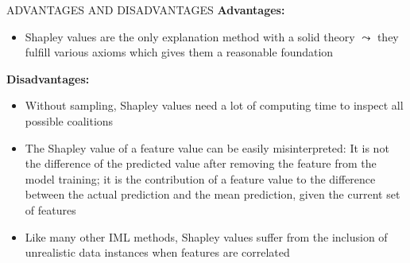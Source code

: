 \documentclass[11pt,compress,t,notes=noshow, aspectratio=169, xcolor=table]{beamer}
\begin{document}

\begin{vbframe}{ADVANTAGES AND DISADVANTAGES}
	\textbf{Advantages:}
	\begin{itemize}
		\item 	Shapley values are the only explanation method with a solid
		theory $\leadsto$ they fulfill various axioms which gives them a reasonable
		foundation
	\end{itemize}
\vspace{0.25cm}
	\textbf{Disadvantages:}
	\begin{itemize}
		\item 	Without sampling, Shapley values need a lot of computing time to
		inspect all possible coalitions
		\item The Shapley value of a feature value can be easily misinterpreted:
		It is not the difference of the predicted value after removing the
		feature from the model training; it is the contribution of a feature
		value to the difference between the actual prediction and the mean
		prediction, given the current set of features
		\item Like many other IML methods, Shapley values suffer from the
		inclusion of unrealistic data instances when features are
		correlated
	\end{itemize}



\end{vbframe}

\endlecture
\end{document}
